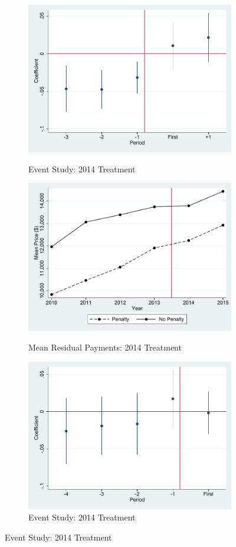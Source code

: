 \documentclass[12pt]{article}
\begin{document}
\newpage
\begin{figure}[!htb]
\caption{Evidence of Parallel or Differential Trends, 2014 and 2015}
\label{fig:event_resid2}
\begin{subfigure}{.5\textwidth}
 \caption{Event Study: 2014 Treatment}
  \centering
  \includegraphics[width=.8\linewidth]{ev_lnprice_hcci_2014.pdf}
  \label{fig:sfig5}
\end{subfigure}%
\begin{subfigure}{.5\textwidth}
  \centering
  \caption{Mean Residual Payments: 2014 Treatment}
  \includegraphics[width=.8\linewidth]{price_resid_2014.pdf}
  \label{fig:sfig6}
\end{subfigure}
\begin{subfigure}{.5\textwidth}
 \caption{Event Study: 2014 Treatment}
  \centering
  \includegraphics[width=.8\linewidth]{ev_lnprice_hcci_2015.pdf}

\end{subfigure}
\end{figure}
\end{document}
